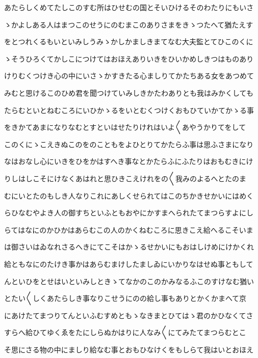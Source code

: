 \documentclass[a4paper,11pt,landscape]{ltjtarticle}
\begin{document}
\par\medskip
あたらしくめてたしこのすむ所はひせむの国とそいひけるそのわたりにもいさ
\par\medskip
ゝかよしある人はまつこのせうにのむまこのありさまをきゝつたへて猶たえす
\par\medskip
をとつれくるもいといみしうみゝかしかましきまてなむ大夫監とてひこのくに
\par\medskip
ゝそうひろくてかしこにつけてはおほえありいきをひいかめしきつはものあり
\par\medskip
けりむくつけき心の中にいさゝかすきたる心ましりてかたちある女をあつめて
\par\medskip
みむと思けるこのひめ君を聞つけていみしきかたわありとも我はみかくしても
\par\medskip
たらむといとねむころにいひかゝるをいとむくつけくおもひていかてかゝる事
\par\medskip
をきかてあまになりなむとすといはせたりけれはいよ〱あやうかりてをして
\par\medskip
このくにゝこえきぬこのをのこともをよひとりてかたらふ事は思ふさまになり
\par\medskip
なはおなし心にいきをひをかはすへき事なとかたらふにふたりはおもむきにけ
\par\medskip
りしはしこそにけなくあはれと思ひきこえけれをの〱我みのよるへとたのま
\par\medskip
むにいとたのもしき人なりこれにあしくせられてはこのちかきせかいにはめく
\par\medskip
らひなむやよき人の御すちといふともおやにかすまへられたてまつらすよにし
\par\medskip
らてはなにのかひかはあらむこの人のかくねむころに思きこえ給へるこそいま
\par\medskip
は御さいはゐなれさるへきにてこそはかゝるせかいにもおはしけめにけかくれ
\par\medskip
給ともなにのたけき事かはあらむまけしたましゐにいかりなはせぬ事ともして
\par\medskip
んといひをとせはいといみしときゝてなかのこのかみなるふこのすけなむ猶い
\par\medskip
とたい〱しくあたらしき事なりこせうにのの給し事もありとかくかまへて京
\par\medskip
にあけたてまつりてんといふむすめともゝなきまとひてはゝ君のかひなくてさ
\par\medskip
すらへ給ひてゆくゑをたにしらぬかはりに人なみ〱にてみたてまつらむとこ
\par\medskip
そ思にさる物の中にましり給なむ事とおもひなけくをもしらて我はいとおほえ
\par\medskip
\end{document}
